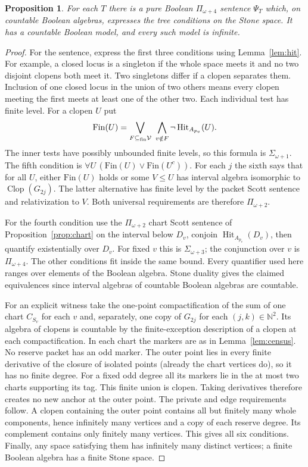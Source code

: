 \documentclass[11pt,letterpaper]{article}
\newtheorem{proposition}[theorem]{Proposition}
\theoremstyle{definition}\newtheorem{definition}[theorem]{Definition}
\newcommand{\N}{\mathbb N}
\newcommand{\Clop}{\operatorname{Clop}}
\newcommand{\Hit}{\operatorname{Hit}}
\begin{document}
\begin{proposition}\label{prop:guard}
For each \(T\) there is a pure Boolean \(\Pi_{\omega+4}\) sentence
\(\Psi_T\) which, on countable Boolean algebras, expresses the tree
conditions on the Stone space. It has a countable Boolean model, and every
such model is infinite.
\end{proposition}
\begin{proof}
For the sentence, express the first three conditions using
Lemma~\ref{lem:hit}. For example, a closed locus is a singleton if the
whole space meets it and no two disjoint clopens both meet it. Two
singletons differ if a clopen separates them. Inclusion of one closed
locus in the union of two others means every clopen meeting the first meets
at least one of the other two. Each individual test has finite level. For
a clopen \(U\) put
\[
 \mathrm{Fin}(U)=
 \bigvee_{F\subseteq_{\rm fin}\mathcal V}
                 \ \bigwedge_{v\notin F}\neg\Hit_{A_{p_v}}(U).
\]
The inner tests have possibly unbounded finite levels, so this formula is
\(\Sigma_{\omega+1}\). The fifth condition is
\(\forall U\,(\mathrm{Fin}(U)\vee\mathrm{Fin}(U^c))\). For each \(j\)
the sixth says that for all \(U\), either \(\mathrm{Fin}(U)\) holds or
some \(V\le U\) has interval algebra isomorphic to \(\Clop(G_{2j})\).
The latter alternative has finite level by the packet Scott sentence and
relativization to \(V\). Both universal requirements are therefore
\(\Pi_{\omega+2}\).

For the fourth condition use the \(\Pi_{\omega+2}\) chart Scott sentence
of Proposition~\ref{prop:chart} on the interval below \(D_v\), conjoin
\(\Hit_{A_{p_v}}(D_v)\), then quantify existentially over \(D_v\).
For fixed \(v\) this is \(\Sigma_{\omega+3}\); the conjunction over \(v\)
is \(\Pi_{\omega+4}\). The other conditions fit inside the same bound.
Every quantifier used here ranges over elements of the Boolean algebra.
Stone duality gives the claimed equivalences since interval algebras of
countable Boolean algebras are countable.

For an explicit witness take the one-point compactification of the sum
of one chart \(C_{S_v}\) for each \(v\) and, separately, one copy of
\(G_{2j}\) for each \((j,k)\in\N^2\). Its algebra of clopens is countable
by the finite-exception description of a clopen at each compactification.
In each chart the markers are as in Lemma~\ref{lem:census}. No reserve
packet has an odd marker. The outer point lies in every finite derivative
of the closure of isolated points (already the chart vertices do), so it
has no finite degree. For a fixed odd degree all its markers lie in the
at most two charts supporting its tag. This finite union is clopen. Taking
derivatives therefore creates no new anchor at the outer point. The
private and edge requirements follow. A clopen containing the outer point
contains all but finitely many whole components, hence infinitely many
vertices and a copy of each reserve degree. Its complement contains only
finitely many vertices. This gives all six conditions. Finally, any space
satisfying them has infinitely many distinct vertices; a finite Boolean
algebra has a finite Stone space.
\end{proof}
\end{document}
